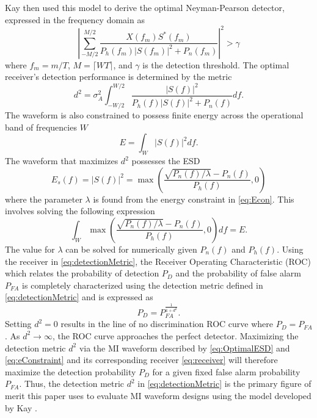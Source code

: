 \documentclass{article}
\begin{document}
Kay \cite{Kay2007} then used this model to derive the optimal Neyman-Pearson detector, expressed in the frequency domain as
\begin{equation}
\left|\sum_{-M/2}^{M/2}\dfrac{X\left(f_m\right)S^*\left(f_m\right)}{P_h\left(f_m\right)|S\left(f_m\right)|^2 + P_n\left(f_m\right)}  \right|^2 > \gamma
\label{eq:receiver}
\end{equation}
where $f_m = m/T$, $M = \lceil WT \rceil$, and $\gamma$ is the detection threshold.  The optimal receiver's detection performance is determined by the metric
\begin{equation}
d^2 = \sigma_A^2\int_{-W/2}^{W/2}\dfrac{|S\left(f\right)|^2}{P_h\left(f\right) |S\left(f\right)|^2 + P_n\left(f\right)}df.
\label{eq:detectionMetric}
\end{equation}
The waveform is also constrained to possess finite energy across the operational band of frequencies $W$
\begin{equation}
E=\int_{W}|S\left(f\right)|^2df.
\label{eq:Econ}
\end{equation}
The waveform that maximizes $d^2$ possesses the ESD
\begin{equation}
E_s\left(f\right) = |S\left(f\right)|^2 =  \max\left(\dfrac{\sqrt{P_n\left(f\right)/\lambda}-P_n\left(f\right)}{P_h\left(f\right)}, 0\right)
\label{eq:OptimalESD}
\end{equation}
where the parameter $\lambda$ is found from the energy constraint in \eqref{eq:Econ}.  This involves solving the following expression
\begin{equation}
\int_{W}\max\left(\dfrac{\sqrt{P_n\left(f\right)/\lambda}-P_n\left(f\right)}{P_h\left(f\right)}, 0\right)df = E.
\label{eq:eConstraint}
\end{equation}
The value for $\lambda$ can be solved for numerically given $P_n\left(f\right)$ and $P_h\left(f\right)$.  Using the receiver in \eqref{eq:detectionMetric}, the Receiver Operating Characteristic (ROC) which relates the probability of detection $P_D$ and the probability of false alarm $P_{FA}$ is completely characterized using the detection metric defined in \eqref{eq:detectionMetric} and is expressed as \cite{Kay2007}
\begin{equation}
P_D = P_{FA}^{\frac{1}{1 + d^2}}.
\label{eq:ROC}
\end{equation}
Setting $d^2 = 0$ results in the line of no discrimination ROC curve where $P_D = P_{FA}$.  As $d^2 \to\infty$, the ROC curve approaches the perfect detector.  Maximizing the detection metric $d^2$ via the MI waveform described by \eqref{eq:OptimalESD} and \eqref{eq:eConstraint} and its corresponding receiver \eqref{eq:receiver} will therefore maximize the detection probability $P_D$ for a given fixed false alarm probability $P_{FA}$.  Thus, the detection metric $d^2$ in \eqref{eq:detectionMetric} is the primary figure of merit this paper uses to evaluate MI waveform designs using the model developed by Kay \cite{Kay2007}.
\end{document}
